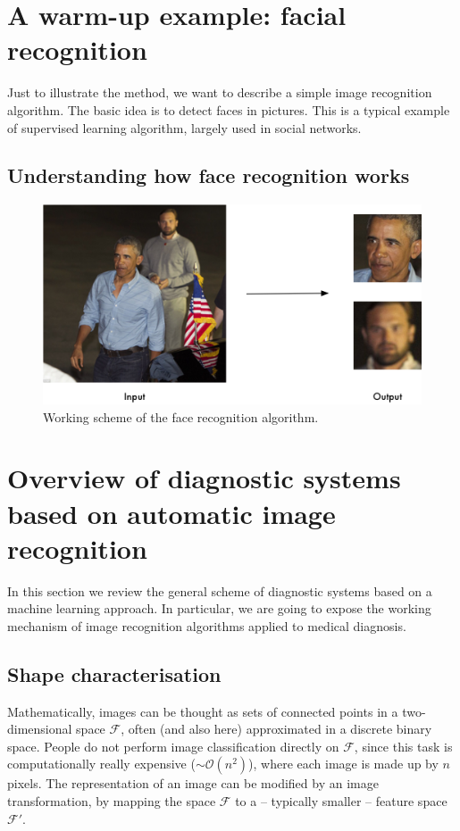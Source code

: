 \documentclass[a4paper, 10pt, superscriptaddress, nofootinbib, showkeys, notitlepage]{revtex4-1}
\begin{document}
\section{A warm-up example: facial recognition}
	Just to illustrate the method, we want to describe a simple image recognition algorithm. 
	The basic idea is to detect faces in pictures.
	This is a typical example of supervised learning algorithm, largely used in social networks. 
	
\subsection{Understanding how face recognition works}
	
		\begin{figure}
  			\includegraphics[width=.7\linewidth]{Images/Obama.png}
 			\caption{Working scheme of the face recognition algorithm.}
 			\label{fig:obama}
		\end{figure}
	
\section{Overview of diagnostic systems based on automatic image recognition}
	In this section we review the general scheme of diagnostic systems based on a machine learning approach. 
	In particular, we are going to expose the working mechanism of image recognition algorithms applied to medical diagnosis.
	
	
\subsection{Shape characterisation}
	Mathematically, images can be thought as sets of connected points in a two-dimensional space $\mathcal{F}$, often (and also here) approximated in a discrete binary space.
	People do not perform image classification directly on $\mathcal{F}$, since this task is computationally really expensive ($\sim \mathcal{O}(n^2)$), where each image is made up by $n$ pixels.
	The representation of an image can be modified by an image transformation, by mapping the space $\mathcal{F}$ to a -- typically smaller -- feature space $\mathcal{F}'$.
	
\end{document}
